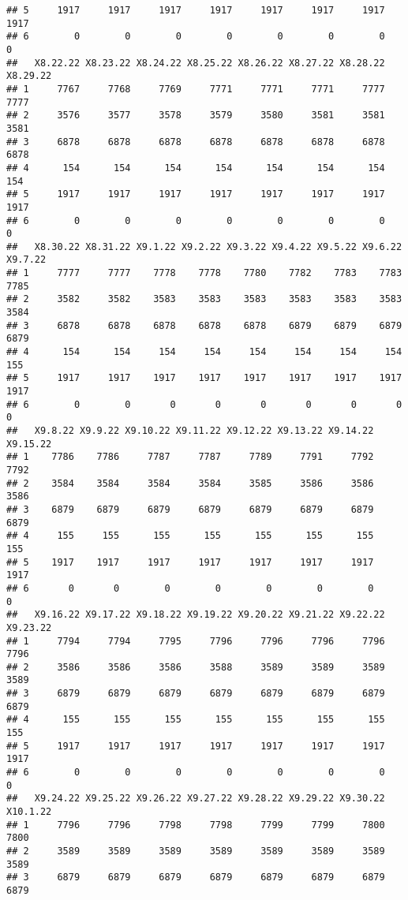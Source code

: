 \documentclass[
]{article}
\begin{document}
\begin{verbatim}
## 5     1917     1917     1917     1917     1917     1917     1917     1917
## 6        0        0        0        0        0        0        0        0
##   X8.22.22 X8.23.22 X8.24.22 X8.25.22 X8.26.22 X8.27.22 X8.28.22 X8.29.22
## 1     7767     7768     7769     7771     7771     7771     7777     7777
## 2     3576     3577     3578     3579     3580     3581     3581     3581
## 3     6878     6878     6878     6878     6878     6878     6878     6878
## 4      154      154      154      154      154      154      154      154
## 5     1917     1917     1917     1917     1917     1917     1917     1917
## 6        0        0        0        0        0        0        0        0
##   X8.30.22 X8.31.22 X9.1.22 X9.2.22 X9.3.22 X9.4.22 X9.5.22 X9.6.22 X9.7.22
## 1     7777     7777    7778    7778    7780    7782    7783    7783    7785
## 2     3582     3582    3583    3583    3583    3583    3583    3583    3584
## 3     6878     6878    6878    6878    6878    6879    6879    6879    6879
## 4      154      154     154     154     154     154     154     154     155
## 5     1917     1917    1917    1917    1917    1917    1917    1917    1917
## 6        0        0       0       0       0       0       0       0       0
##   X9.8.22 X9.9.22 X9.10.22 X9.11.22 X9.12.22 X9.13.22 X9.14.22 X9.15.22
## 1    7786    7786     7787     7787     7789     7791     7792     7792
## 2    3584    3584     3584     3584     3585     3586     3586     3586
## 3    6879    6879     6879     6879     6879     6879     6879     6879
## 4     155     155      155      155      155      155      155      155
## 5    1917    1917     1917     1917     1917     1917     1917     1917
## 6       0       0        0        0        0        0        0        0
##   X9.16.22 X9.17.22 X9.18.22 X9.19.22 X9.20.22 X9.21.22 X9.22.22 X9.23.22
## 1     7794     7794     7795     7796     7796     7796     7796     7796
## 2     3586     3586     3586     3588     3589     3589     3589     3589
## 3     6879     6879     6879     6879     6879     6879     6879     6879
## 4      155      155      155      155      155      155      155      155
## 5     1917     1917     1917     1917     1917     1917     1917     1917
## 6        0        0        0        0        0        0        0        0
##   X9.24.22 X9.25.22 X9.26.22 X9.27.22 X9.28.22 X9.29.22 X9.30.22 X10.1.22
## 1     7796     7796     7798     7798     7799     7799     7800     7800
## 2     3589     3589     3589     3589     3589     3589     3589     3589
## 3     6879     6879     6879     6879     6879     6879     6879     6879

\end{verbatim}
\end{document}
